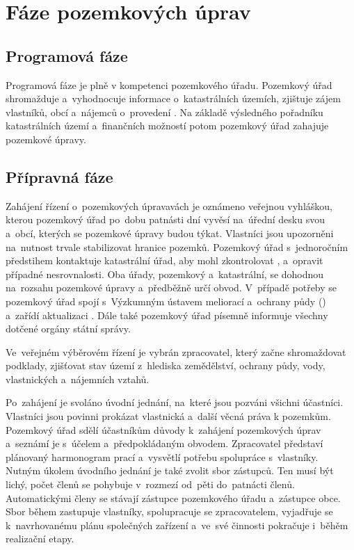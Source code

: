 \section{Fáze pozemkových úprav}
\label{etapy_pu}

\subsection{Programová fáze}
\label{programova_faze}

Programová fáze je plně v kompetenci pozemkového úřadu. Pozemkový úřad shromažduje a~vyhodnocuje informace o~katastrálních územích, zjištuje zájem vlastníků, obcí a~nájemců o~provedení . Na základě výsledného pořadníku katastrálních území a~finančních možností potom pozemkový úřad zahajuje pozemkové úpravy.

\subsection{Přípravná fáze}
\label{pripravna_faze}

Zahájení řízení o~pozemkových úpravavách je oznámeno veřejnou vyhláškou, kterou pozemkový úřad po~dobu patnásti dní vyvěsí na~úřední desku svou a~obcí, kterých se pozemkové úpravy budou týkat. Vlastníci jsou upozorněni na~nutnost trvale stabilizovat hranice pozemků. Pozemkový úřad s~jednoročním předstihem kontaktuje katastrální úřad, aby mohl zkontrolovat ,  a~opravit případné nesrovnalosti. Oba úřady, pozemkový a~katastrální, se dohodnou na~rozsahu pozemkové úpravy a~předběžně určí obvod. V~případě potřeby se pozemkový úřad spojí s~Výzkumným ústavem meliorací a~ochrany půdy () a~zařídí aktualizaci . Dále také pozemkový úřad písemně informuje všechny dotčené orgány státní správy.

Ve~veřejném výběrovém řízení je vybrán zpracovatel, který začne shromaždovat podklady, zjišťovat stav území z~hlediska zemědělství, ochrany půdy, vody, vlastnických a~nájemních vztahů.

Po~zahájení  je svoláno úvodní jednání, na~které jsou pozváni všichni účastníci. Vlastníci jsou povinni prokázat vlastnická a~další věcná práva k pozemkům. Pozemkový úřad sdělí účastníkům důvody k~zahájení pozemkových úprav a~seznámí je s~účelem a~předpokládaným obvodem. Zpracovatel představí plánovaný harmonogram prací a~vysvětlí potřebu spolupráce s~vlastníky. Nutným úkolem úvodního jednání je také zvolit sbor zástupců. Ten musí být lichý, počet členů se pohybuje v~rozmezí od~pěti do~patnácti členů. Automatickými členy se stávají zástupce pozemkového úřadu a~zástupce obce. Sbor během  zastupuje vlastníky, spolupracuje se zpracovatelem, vyjadřuje se k~navrhovanému plánu společných zařízení a~ve~své činnosti pokračuje i~běhěm realizační etapy.

